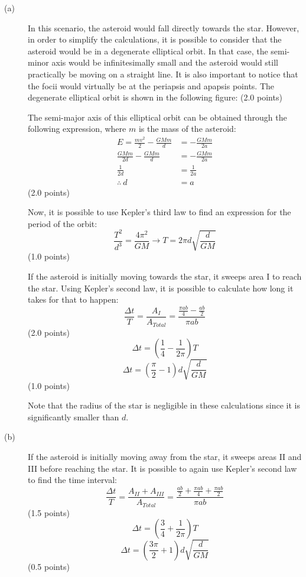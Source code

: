 \begin{description}
\item[(a)] In this scenario, the asteroid would fall directly towards the
  star. However, in order to simplify the calculations, it is possible to
  consider that the asteroid would be in a degenerate elliptical orbit. In
  that case, the semi-minor axis would be infinitesimally small and the
  asteroid would still practically be moving on a straight line. It is also
  important to notice that the focii would virtually be at the periapsis and %
  apapsis points. The degenerate elliptical orbit is shown in the following
  figure: \hfill(2.0 points)


  The semi-major axis of this elliptical orbit can be obtained through the
  following expression, where $m$ is the mass of the asteroid:
  \begin{align*}
    E = \frac{mv^2}{2} - \frac{GMm}{d} &= -\frac{GMm}{2a} \\
    \frac{GMm}{2d} - \frac{GMm}{d} &= -\frac{GMm}{2a} \\
    \frac{1}{2d} &= \frac{1}{2a} \\
    \therefore\ d &= a
  \end{align*}
  \hfill(2.0 points)

  Now, it is possible to use Kepler's third law to find an expression for the
  period of the orbit:
  \[
    \frac{T^2}{d^3} = \frac{4\pi^2}{GM}
      \longrightarrow T = 2\pi d\sqrt{\frac{d}{GM}}
  \]
  \hfill(1.0 points)

  If the asteroid is initially moving towards the star, it sweeps area I to
  reach the star. Using Kepler's second law, it is possible to calculate how
  long it takes for that to happen:
  \[
    \frac{\Delta t}{T} = \frac{A_I}{A_{Total}}
      = \frac{\frac{\pi ab}{4} - \frac{ab}{2}}{\pi ab}
  \]
  \hfill(2.0 points)
  \[
    \Delta t = \left(\frac{1}{4} - \frac{1}{2\pi}\right)T
  \]
  \[
    \boxed{\Delta t = \left(\frac{\pi}{2} - 1\right)d\sqrt{\frac{d}{GM}}}
  \]
  \hfill(1.0 points)

  Note that the radius of the star is negligible in these calculations since
  it is significantly smaller than $d$.

\item[(b)] If the asteroid is initially moving away from the star, it sweeps
  areas II and III before reaching the star. It is possible to again use
  Kepler's second law to find the time interval:
  \[
    \frac{\Delta t}{T} = \frac{A_{II} + A_{III}}{A_{Total}}
      = \frac{\frac{ab}{2} + \frac{\pi ab}{4} + \frac{\pi ab}{2}}{\pi ab}
  \]
  \hfill(1.5 points)
  \[
    \Delta t = \left(\frac{3}{4} + \frac{1}{2\pi}\right)T
  \]
  \[
    \boxed{\Delta t = \left(\frac{3\pi}{2} + 1\right)d\sqrt{\frac{d}{GM}}}
  \]
  \hfill(0.5 points)
\end{description}

